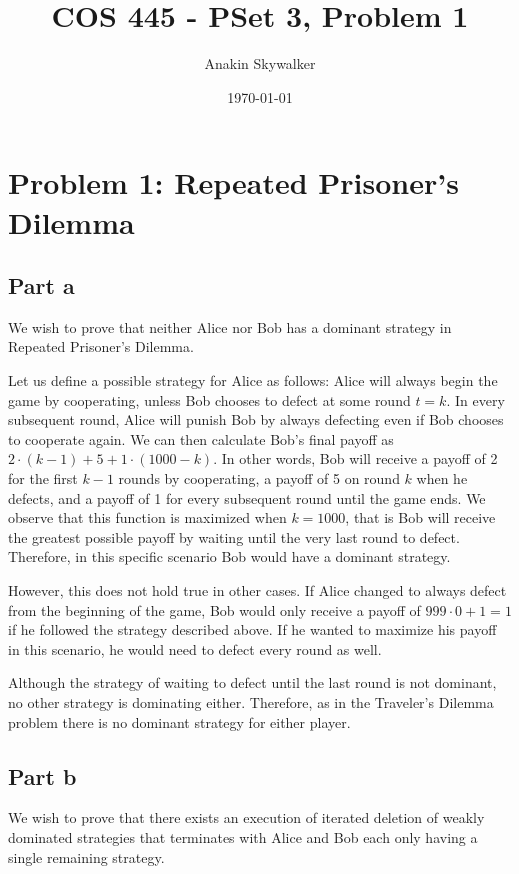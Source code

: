 \documentclass[12pt]{article}%
\begin{document}
\title{COS 445 - PSet 3, Problem 1} %
\author{Anakin Skywalker} %
\date{\today}
\maketitle
\section*{Problem 1: Repeated Prisoner’s Dilemma}
\subsection*{Part a}
We wish to prove that neither Alice nor Bob has a dominant strategy in Repeated Prisoner's Dilemma.

Let us define a possible strategy for Alice as follows: Alice will always begin the game by cooperating, unless Bob chooses to defect at some round $t = k$. In every subsequent round, Alice will punish Bob by always defecting even if Bob chooses to cooperate again. We can then calculate Bob's final payoff as $2 \cdot (k - 1) + 5 + 1 \cdot (1000 - k)$. In other words, Bob will receive a payoff of 2 for the first $k - 1$ rounds by cooperating, a payoff of 5 on round $k$ when he defects, and a payoff of 1 for every subsequent round until the game ends. We observe that this function is maximized when $k = 1000$, that is Bob will receive the greatest possible payoff by waiting until the very last round to defect. Therefore, in this specific scenario Bob would have a dominant strategy.

However, this does not hold true in other cases. If Alice changed to always defect from the beginning of the game, Bob would only receive a payoff of $999 \cdot 0 + 1 = 1$ if he followed the strategy described above. If he wanted to maximize his payoff in this scenario, he would need to defect every round as well.

Although the strategy of waiting to defect until the last round is not dominant, no other strategy is dominating either. Therefore, as in the Traveler’s Dilemma problem there is no dominant strategy for either player.

\subsection*{Part b}
We wish to prove that there exists an execution of iterated deletion of weakly dominated strategies that terminates with Alice and Bob each only having a single remaining strategy.
\end{document}
